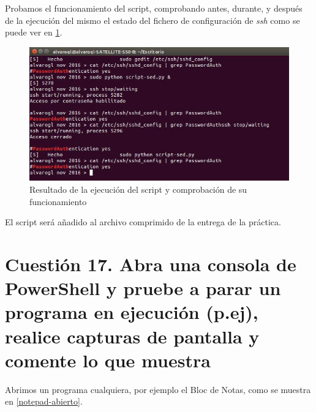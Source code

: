 Probamos el funcionamiento del script, comprobando antes, durante, y después de la ejecución del mismo el estado del fichero de configuración de \textit{ssh} como se puede ver en \ref{sed-scriptpy-prueba}.

\begin{figure}[H]
	\centering
	\includegraphics[scale=0.6]{sed-scriptpy-prueba.png}
	\caption{Resultado de la ejecución del script y comprobación de su funcionamiento} \label{sed-scriptpy-prueba}
\end{figure}

El script será añadido al archivo comprimido de la entrega de la práctica.

\section{Cuestión 17. Abra una consola de PowerShell y pruebe a parar un programa en ejecución (p.ej), realice capturas de pantalla y comente lo que muestra}

Abrimos un programa cualquiera, por ejemplo el Bloc de Notas, como se muestra en \ref{notepad-abierto}.

